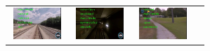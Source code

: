 \documentclass[letterpaper, 10 pt, conference]{ieeeconf}  %
\begin{document}
\newcommand{\widthA}{2cm}
\newcommand{\heightA}{1.2cm}
\begin{figure}
	\centering
	\begin{tabular}{p{1.7cm}p{1.7cm}p{1.7cm}p{1.7cm}}
		\includegraphics[width=\widthA,height=\heightA]{4-railroad} &
		\includegraphics[width=\widthA,height=\heightA]{6-tunnel} &
		\includegraphics[width=\widthA,height=\heightA]{1-outdoor}&

\end{tabular}
\end{figure}
\end{document}
